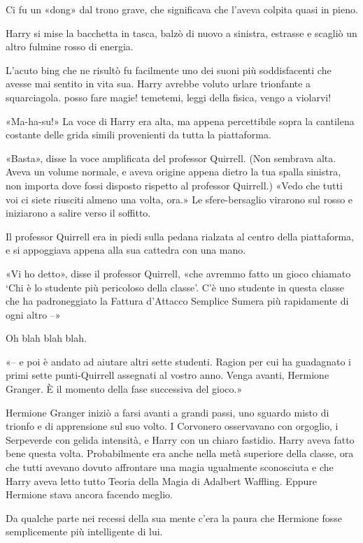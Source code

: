 Ci fu un «dong» dal trono grave, che significava che l’aveva colpita quasi in pieno.

Harry si mise la bacchetta in tasca, balzò di nuovo a sinistra, estrasse e scagliò un altro fulmine rosso di energia.

L’acuto bing che ne risultò fu facilmente uno dei suoni più soddisfacenti che avesse mai sentito in vita sua. Harry avrebbe voluto urlare trionfante a squarciagola. posso fare magie! temetemi, leggi della fisica, vengo a violarvi!

«Ma-ha-su!» La voce di Harry era alta, ma appena percettibile sopra la cantilena costante delle grida simili provenienti da tutta la piattaforma.

«Basta», disse la voce amplificata del professor Quirrell. (Non sembrava alta. Aveva un volume normale, e aveva origine appena dietro la tua spalla sinistra, non importa dove fossi disposto rispetto al professor Quirrell.) «Vedo che tutti voi ci siete riusciti almeno una volta, ora.» Le sfere-bersaglio virarono sul rosso e iniziarono a salire verso il soffitto.

Il professor Quirrell era in piedi sulla pedana rialzata al centro della piattaforma, e si appoggiava appena alla sua cattedra con una mano.

«Vi ho detto», disse il professor Quirrell, «che avremmo fatto un gioco chiamato ‘Chi è lo studente più pericoloso della classe’. C’è uno studente in questa classe che ha padroneggiato la Fattura d’Attacco Semplice Sumera più rapidamente di ogni altro –»

Oh blah blah blah.

«– e poi è andato ad aiutare altri sette studenti. Ragion per cui ha guadagnato i primi sette punti-Quirrell assegnati al vostro anno. Venga avanti, Hermione Granger. È il momento della fase successiva del gioco.»

Hermione Granger iniziò a farsi avanti a grandi passi, uno sguardo misto di trionfo e di apprensione sul suo volto. I Corvonero osservavano con orgoglio, i Serpeverde con gelida intensità, e Harry con un chiaro fastidio. Harry aveva fatto bene questa volta. Probabilmente era anche nella metà superiore della classe, ora che tutti avevano dovuto affrontare una magia ugualmente sconosciuta e che Harry aveva letto tutto Teoria della Magia di Adalbert Waffling. Eppure Hermione stava ancora facendo meglio.

Da qualche parte nei recessi della sua mente c’era la paura che Hermione fosse semplicemente più intelligente di lui.

